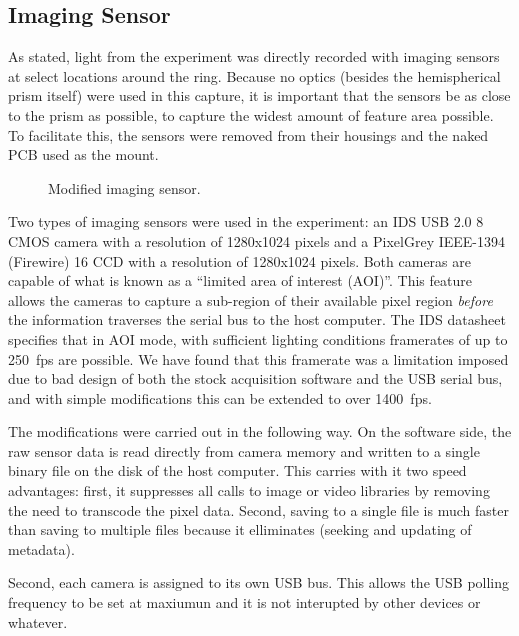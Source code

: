 \subsection{Imaging Sensor}
As stated, light from the experiment was directly recorded with imaging
sensors at select locations around the ring.  Because no optics (besides
the hemispherical prism itself) were used in this capture, it is important
that the sensors be as close to the prism as possible, to capture the
widest amount of feature area possible.  To facilitate this, the sensors
were removed from their housings and the naked PCB used as the mount.
\begin{figure}[ht]
 \centering
 \ersatzfigure
 \caption{Modified imaging sensor.}
 \label{fig:imagingsensor}
\end{figure}

Two types of imaging sensors were used in the experiment: an IDS USB 2.0
\SI{8}{\bit} CMOS camera with a resolution of 1280x1024 pixels and a PixelGrey
IEEE-1394 (Firewire) \SI{16}{\bit} CCD  with a resolution of 1280x1024 pixels.
Both cameras are capable of what is known as a ``limited area of interest
(AOI)''.  This feature allows the cameras to capture a sub-region of their
available pixel region \textit{before} the information traverses the serial
bus to the host computer.  The IDS datasheet specifies that in AOI mode,
with sufficient lighting conditions framerates of up to \SI{250}{fps} are
possible.  We have found that this framerate was a limitation imposed due
to bad design of both the stock acquisition software and the USB serial
bus, and with simple modifications this can be extended to over \SI{1400}{fps}.

The modifications were carried out in the following way.  On the software
side, the raw sensor data is read directly from camera memory and written
to a single binary file on the disk of the host computer.  This carries
with it two speed advantages: first, it suppresses all calls to image or
video libraries by removing the need to transcode the pixel data.  Second,
saving to a single file is much faster than saving to multiple files
because it elliminates (seeking and updating of metadata).

Second, each camera is assigned to its own USB bus.  This allows the USB
polling frequency to be set at maxiumun and it is not interupted by other
devices or whatever.
